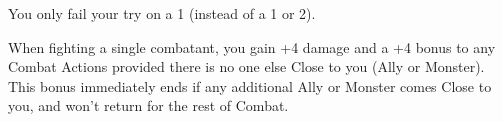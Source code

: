 \begin{multicols*}{2}

You only fail your \DEATH try on a 1 (instead of a 1 or 2).


When fighting a single combatant, you gain +4 damage and a +4 bonus to any Combat Actions provided there is no one else Close to you (Ally or Monster). This bonus immediately ends if any additional Ally or Monster comes Close to you, and won't return for the rest of Combat.

\end{multicols*}
